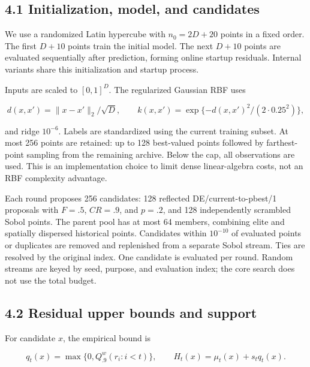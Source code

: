 \documentclass[11pt,a4paper]{article}
\begin{document}
\hypertarget{initialization-model-and-candidates}{%
\subsection{4.1 Initialization, model, and
candidates}\label{initialization-model-and-candidates}}

We use a randomized Latin hypercube with \(n_0=2D+20\) points in a fixed
order. The first \(D+10\) points train the initial model. The next
\(D+10\) points are evaluated sequentially after prediction, forming
online startup residuals. Internal variants share this initialization
and startup process.

Inputs are scaled to \([0,1]^D\). The regularized Gaussian RBF uses

\[d(x,x')=\|x-x'\|_2/\sqrt D,\qquad k(x,x')=\exp\{-d(x,x')^2/(2\cdot0.25^2)\},\]

and ridge \(10^{-6}\). Labels are standardized using the current
training subset. At most 256 points are retained: up to 128 best-valued
points followed by farthest-point sampling from the remaining archive.
Below the cap, all observations are used. This is an implementation
choice to limit dense linear-algebra costs, not an RBF complexity
advantage.

Each round proposes 256 candidates: 128 reflected DE/current-to-pbest/1
proposals with \(F=.5\), \(CR=.9\), and \(p=.2\), and 128 independently
scrambled Sobol points. The parent pool has at most 64 members,
combining elite and spatially dispersed historical points. Candidates
within \(10^{-10}\) of evaluated points or duplicates are removed and
replenished from a separate Sobol stream. Ties are resolved by the
original index. One candidate is evaluated per round. Random streams are
keyed by seed, purpose, and evaluation index; the core search does not
use the total budget.

\begin{samepage}

\hypertarget{residual-upper-bounds-and-support}{%
\subsection{4.2 Residual upper bounds and
support}\label{residual-upper-bounds-and-support}}

For candidate \(x\), the empirical bound is

\[q_t(x)=\max\{0,Q^w_{.9}(r_i:i<t)\},\qquad H_t(x)=\mu_t(x)+s_tq_t(x).\]

\end{samepage}
\end{document}
